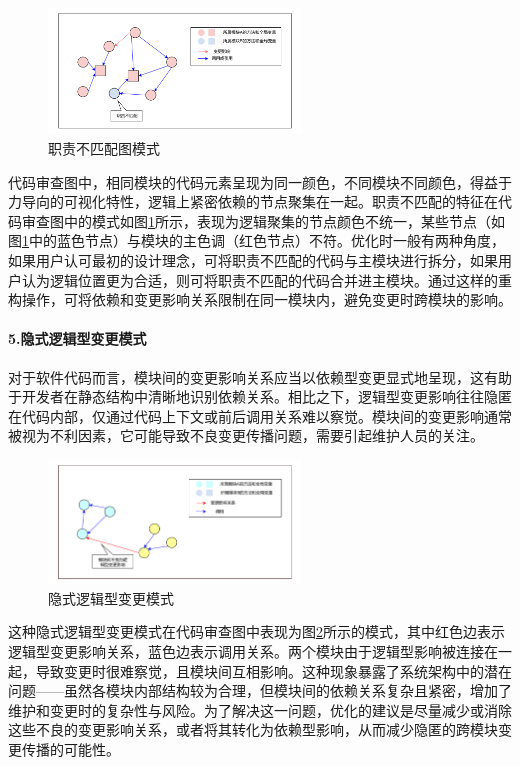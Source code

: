 \begin{figure}[h]
\centering
\includegraphics[width = 0.6\textwidth]{figures/职责不匹配_2.pdf}
\caption{职责不匹配图模式}
\label{1_职责不匹配图模式}
\end{figure}

代码审查图中，相同模块的代码元素呈现为同一颜色，不同模块不同颜色，得益于力导向的可视化特性，逻辑上紧密依赖的节点聚集在一起。职责不匹配的特征在代码审查图中的模式如图\ref{1_职责不匹配图模式}所示，表现为逻辑聚集的节点颜色不统一，某些节点（如图\ref{1_职责不匹配图模式}中的蓝色节点）与模块的主色调（红色节点）不符。优化时一般有两种角度，如果用户认可最初的设计理念，可将职责不匹配的代码与主模块进行拆分，如果用户认为逻辑位置更为合适，则可将职责不匹配的代码合并进主模块。通过这样的重构操作，可将依赖和变更影响关系限制在同一模块内，避免变更时跨模块的影响。


\paragraph{5.隐式逻辑型变更模式} 对于软件代码而言，模块间的变更影响关系应当以依赖型变更显式地呈现，这有助于开发者在静态结构中清晰地识别依赖关系。相比之下，逻辑型变更影响往往隐匿在代码内部，仅通过代码上下文或前后调用关系难以察觉。模块间的变更影响通常被视为不利因素，它可能导致不良变更传播问题，需要引起维护人员的关注。

\begin{figure}[h]
\centering
\includegraphics[width = 0.6\textwidth]{figures/不良变更影响_2.pdf}
\caption{隐式逻辑型变更模式}
\label{1_不良的逻辑型变更影响}
\end{figure}


这种隐式逻辑型变更模式在代码审查图中表现为图\ref{1_不良的逻辑型变更影响}所示的模式，其中红色边表示逻辑型变更影响关系，蓝色边表示调用关系。两个模块由于逻辑型影响被连接在一起，导致变更时很难察觉，且模块间互相影响。这种现象暴露了系统架构中的潜在问题——虽然各模块内部结构较为合理，但模块间的依赖关系复杂且紧密，增加了维护和变更时的复杂性与风险。为了解决这一问题，优化的建议是尽量减少或消除这些不良的变更影响关系，或者将其转化为依赖型影响，从而减少隐匿的跨模块变更传播的可能性。

